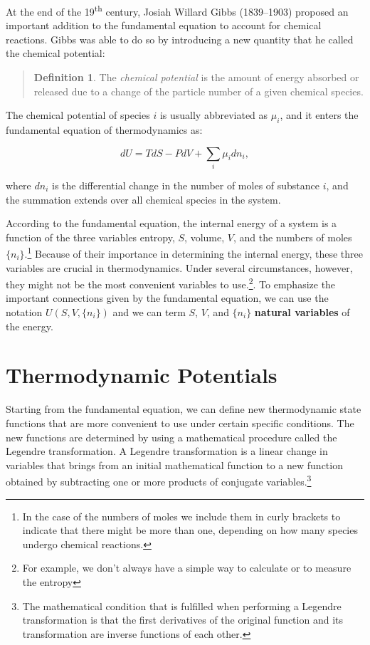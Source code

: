 \documentclass[
]{book}
\theoremstyle{definition}
\newtheorem{definition}{Definition}[chapter]
\theoremstyle{definition}
\theoremstyle{definition}
\theoremstyle{remark}
\begin{document}
At the end of the 19\textsuperscript{th} century, Josiah Willard Gibbs (1839--1903) proposed an important addition to the fundamental equation to account for chemical reactions. Gibbs was able to do so by introducing a new quantity that he called the chemical potential:

\begin{quote}
\begin{definition}
\protect\hypertarget{def:chemicalpot}{}{\label{def:chemicalpot} }The \emph{chemical potential} is the amount of energy absorbed or released due to a change of the particle number of a given chemical species.
\end{definition}
\end{quote}

The chemical potential of species \(i\) is usually abbreviated as \(\mu_i\), and it enters the fundamental equation of thermodynamics as:

\begin{equation}
dU = TdS-PdV+\sum_i\mu_i dn_i,
\label{eq:dunv2}
\end{equation}

where \(dn_i\) is the differential change in the number of moles of substance \(i\), and the summation extends over all chemical species in the system.

According to the fundamental equation, the internal energy of a system is a function of the three variables entropy, \(S\), volume, \(V\), and the numbers of moles \(\{n_i\}\).\footnote{In the case of the numbers of moles we include them in curly brackets to indicate that there might be more than one, depending on how many species undergo chemical reactions.} Because of their importance in determining the internal energy, these three variables are crucial in thermodynamics. Under several circumstances, however, they might not be the most convenient variables to use.\footnote{For example, we don't always have a simple way to calculate or to measure the entropy}. To emphasize the important connections given by the fundamental equation, we can use the notation \(U(S,V,\{n_i\})\) and we can term \(S\), \(V\), and \(\{n_i\}\) \textbf{natural variables} of the energy.

\hypertarget{thermpot}{%
\section{Thermodynamic Potentials}\label{thermpot}}

Starting from the fundamental equation, we can define new thermodynamic state functions that are more convenient to use under certain specific conditions. The new functions are determined by using a mathematical procedure called the Legendre transformation. A Legendre transformation is a linear change in variables that brings from an initial mathematical function to a new function obtained by subtracting one or more products of conjugate variables.\footnote{The mathematical condition that is fulfilled when performing a Legendre transformation is that the first derivatives of the original function and its transformation are inverse functions of each other.}
\end{document}
